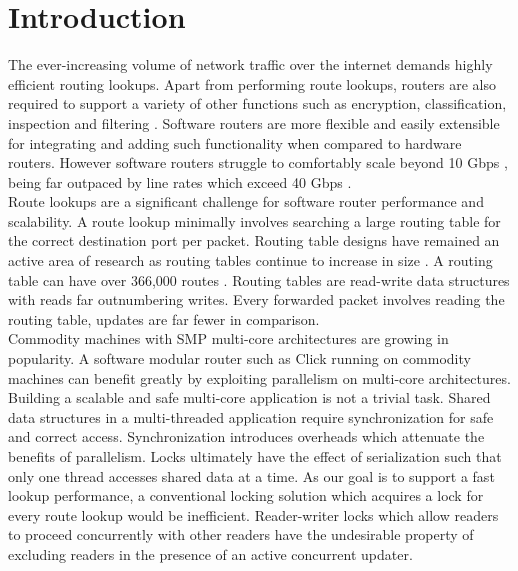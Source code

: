 \documentclass[a4paper]{article}
\begin{document}




\tableofcontents

\pagebreak
\section{Introduction}
The ever-increasing volume of network traffic over the internet demands highly efficient routing lookups. Apart from performing route lookups, routers are also required to support a variety of other functions such as encryption, classification, inspection and filtering \cite{routebricks}. Software routers are more flexible and easily extensible for integrating and adding such functionality when compared to hardware routers. However software routers struggle to comfortably scale beyond 10 Gbps \cite{routebricks}, being far outpaced by line rates which exceed 40 Gbps \cite{attlinkrate}.\\

Route lookups are a significant challenge for software router performance and scalability. A route lookup minimally involves searching a large routing table for the correct destination port per packet. Routing table designs have remained an active area of research \cite{fastrtable1,fastrtable2,fastrtable3} as routing tables continue to increase in size \cite{incrtablesize}. A routing table can have over 366,000 routes \cite{routeviews}. Routing tables are read-write data structures with reads far outnumbering writes. Every forwarded packet involves reading the routing table, updates are far fewer in comparison. \\

Commodity machines with SMP multi-core architectures are growing in popularity. A software modular router such as Click \cite{click} running on commodity machines  can benefit greatly by exploiting parallelism on multi-core architectures. Building a scalable and safe multi-core application is not a trivial task. Shared data structures in a multi-threaded application require synchronization for safe and correct access. Synchronization introduces overheads which attenuate the benefits of parallelism. Locks ultimately have the effect of  serialization such that only one thread accesses shared data at a time. As our goal is to support a fast lookup performance, a conventional locking solution which acquires a lock for every route lookup would be inefficient. Reader-writer locks which allow readers to proceed concurrently with other readers have the undesirable property of excluding readers in the presence of an active concurrent updater.\\
\end{document}
